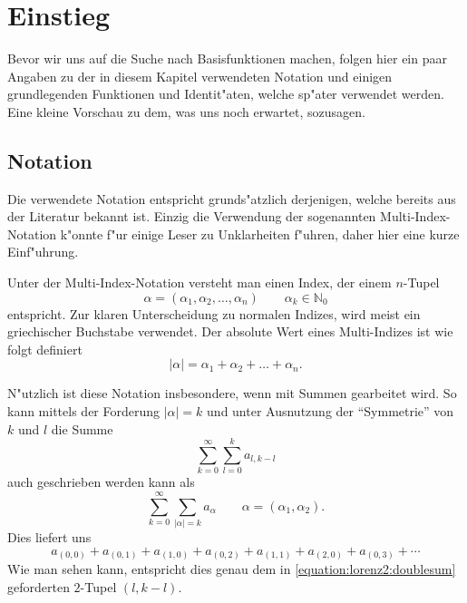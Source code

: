 \section{Einstieg\label{section:lorenz2:einstieg}}

Bevor wir uns auf die Suche nach Basisfunktionen machen, folgen hier ein paar 
Angaben zu der in diesem Kapitel verwendeten Notation und einigen 
grundlegenden Funktionen und Identit"aten, welche sp"ater verwendet werden. 
Eine kleine Vorschau zu dem, was uns noch erwartet, sozusagen.

\subsection{Notation}
Die verwendete Notation entspricht grunds"atzlich derjenigen, welche 
bereits aus der Literatur bekannt ist. Einzig die Verwendung der 
sogenannten Multi-Index-Notation k"onnte f"ur einige Leser zu Unklarheiten 
f"uhren, daher hier eine kurze Einf"uhrung.

Unter der Multi-Index-Notation versteht man einen Index, der einem 
$n$-Tupel
\begin{equation*}
	\alpha = (\alpha_1, \alpha_2, \dotsc, \alpha_n) \qquad \alpha_k \in 
	\mathbb{N}_{0}
\end{equation*}
entspricht. Zur klaren Unterscheidung zu normalen Indizes, wird meist ein 
griechischer Buchstabe verwendet. Der absolute Wert eines Multi-Indizes ist wie 
folgt definiert
\begin{equation*}
	|\alpha| = \alpha_1 + \alpha_2 + \dots + \alpha_n.
\end{equation*}
 
N"utzlich ist diese Notation insbesondere, wenn mit Summen gearbeitet wird. So 
kann mittels der Forderung $|\alpha| = k$ und unter Ausnutzung der 
``Symmetrie'' von $k$ und $l$ die Summe
\begin{equation}
	\sum_{k = 0}^{\infty}\sum_{l = 0}^{k}a_{l, k - l}
	\label{equation:lorenz2:doublesum}
\end{equation}
auch geschrieben werden kann als
\begin{equation*}
	\sum_{k = 0}^{\infty}\sum_{|\alpha| = k}a_{\alpha}
	\qquad \alpha = (\alpha_1, \alpha_2).
\end{equation*}
Dies liefert uns
\begin{equation*}
	a_{(0,0)} +
	a_{(0,1)} + a_{(1,0)} +
	a_{(0,2)} + a_{(1,1)} + a_{(2,0)} +
	a_{(0,3)} + \dotsb
\end{equation*}
Wie man sehen kann, entspricht dies genau dem in 
\cref{equation:lorenz2:doublesum} geforderten $2$-Tupel $(l, k - l)$.

